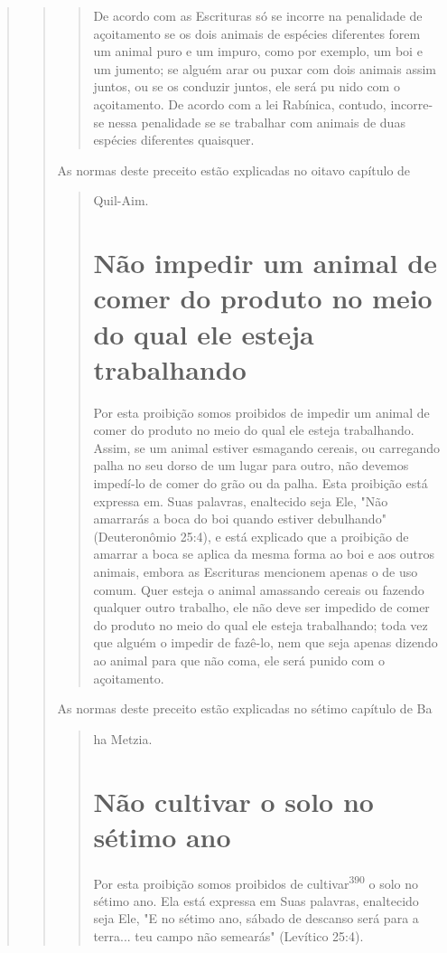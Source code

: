 \begin{quote}
\begin{quote}
\begin{quote}
De acordo com as Escrituras só se incorre na penalidade de açoi­tamento
se os dois animais de espécies diferentes forem um animal puro e um
impuro, como por exemplo, um boi e um jumento; se alguém arar ou puxar
com dois animais assim juntos, ou se os conduzir juntos, ele será pu
nido com o açoitamento. De acordo com a lei Rabínica, contudo,
incorre-se nessa penalidade se se trabalhar com animais de duas espécies
diferentes quaisquer.
\end{quote}

As normas deste preceito estão explicadas no oitavo capítulo de

\begin{quote}
Quil-Aim.

\section{Não impedir um animal de comer do produto no meio do qual ele esteja trabalhando}

Por esta proibição somos proibidos de impedir um animal de comer do
produto no meio do qual ele esteja trabalhando. Assim, se um animal
esti­ver esmagando cereais, ou carregando palha no seu dorso de um lugar
para ou­tro, não devemos impedí-lo de comer do grão ou da palha. Esta
proibição está expressa em. Suas palavras, enaltecido seja Ele, "Não
amarrarás a boca do boi quando estiver debulhando" (Deuteronômio 25:4),
e está explicado que a proi­bição de amarrar a boca se aplica da mesma
forma ao boi e aos outros animais, embora as Escrituras mencionem apenas
o de uso comum. Quer esteja o ani­mal amassando cereais ou fazendo
qualquer outro trabalho, ele não deve ser impedido de comer do produto
no meio do qual ele esteja trabalhando; toda vez que alguém o impedir de
fazê-lo, nem que seja apenas dizendo ao animal para que não coma, ele
será punido com o açoitamento.
\end{quote}

As normas deste preceito estão explicadas no sétimo capítulo de Ba

\begin{quote}
ha Metzia.

\section{Não cultivar o solo no sétimo ano}

Por esta proibição somos proibidos de cultivar\textsuperscript{390} o
solo no sétimo ano. Ela está expressa em Suas palavras, enaltecido seja
Ele, "E no sétimo ano, sábado de descanso será para a terra... teu campo
não semearás" (Levítico 25:4).


\end{quote}
\end{quote}
\end{quote}
